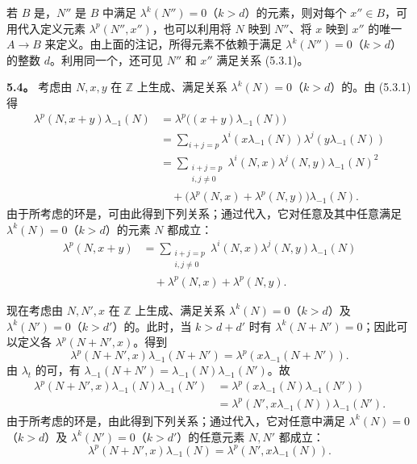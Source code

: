 若 $B$ 是，$N''$ 是 $B$ 中满足 $\lambda^k(N'')=0$（$k>d$）的元素，则对每个 $x''\in B$，可用代入定义元素 $\lambda^p(N'',x'')$，也可以利用将 $N$ 映到 $N''$、将 $x$ 映到 $x''$ 的唯一
$A\longrightarrow B$ 来定义。由上面的注记，所得元素不依赖于满足 $\lambda^k(N'')=0$（$k>d$）的整数 $d$。利用同一个，还可见 $N''$ 和 $x''$ 满足关系 (5.3.1)。

\textbf{5.4。} 考虑由 $N,x,y$ 在 $\mathbb Z$ 上生成、满足关系 $\lambda^k(N)=0$（$k>d$）的。由 (5.3.1) 得
\[
\begin{aligned}
\lambda^p(N,x+y)\lambda_{-1}(N)
&=\lambda^p\bigl((x+y)\lambda_{-1}(N)\bigr)\\
&=\sum_{i+j=p}\lambda^i(x\lambda_{-1}(N))\lambda^j(y\lambda_{-1}(N))\\
&=\sum_{\substack{i+j=p\\i,j\ne0}}\lambda^i(N,x)\lambda^j(N,y)\lambda_{-1}(N)^2\\
&\quad+\bigl(\lambda^p(N,x)+\lambda^p(N,y)\bigr)\lambda_{-1}(N).
\end{aligned}
\]
由于所考虑的环是，可由此得到下列关系；通过代入，它对任意及其中任意满足 $\lambda^k(N)=0$（$k>d$）的元素 $N$ 都成立：
\[
\begin{aligned}
\lambda^p(N,x+y)
&=\sum_{\substack{i+j=p\\i,j\ne0}}\lambda^i(N,x)\lambda^j(N,y)\lambda_{-1}(N)\\
&\quad+\lambda^p(N,x)+\lambda^p(N,y).
\end{aligned}
\tag{5.4.1}
\]

现在考虑由 $N,N',x$ 在 $\mathbb Z$ 上生成、满足关系 $\lambda^k(N)=0$（$k>d$）及 $\lambda^k(N')=0$（$k>d'$）的。此时，当 $k>d+d'$ 时有 $\lambda^k(N+N')=0$；因此可以定义各 $\lambda^p(N+N',x)$。得到
\[
\lambda^p(N+N',x)\lambda_{-1}(N+N')
=\lambda^p(x\lambda_{-1}(N+N')).
\]
由 $\lambda_t$ 的可，有 $\lambda_{-1}(N+N')=\lambda_{-1}(N)\lambda_{-1}(N')$。故
\[
\begin{aligned}
\lambda^p(N+N',x)\lambda_{-1}(N)\lambda_{-1}(N')
&=\lambda^p(x\lambda_{-1}(N)\lambda_{-1}(N'))\\
&=\lambda^p(N',x\lambda_{-1}(N))\lambda_{-1}(N').
\end{aligned}
\]
由于所考虑的环是，由此得到下列关系；通过代入，它对任意中满足 $\lambda^k(N)=0$（$k>d$）及 $\lambda^k(N')=0$（$k>d'$）的任意元素 $N,N'$ 都成立：
\[
\lambda^p(N+N',x)\lambda_{-1}(N)
=\lambda^p(N',x\lambda_{-1}(N)).
\tag{5.4.2}
\]

